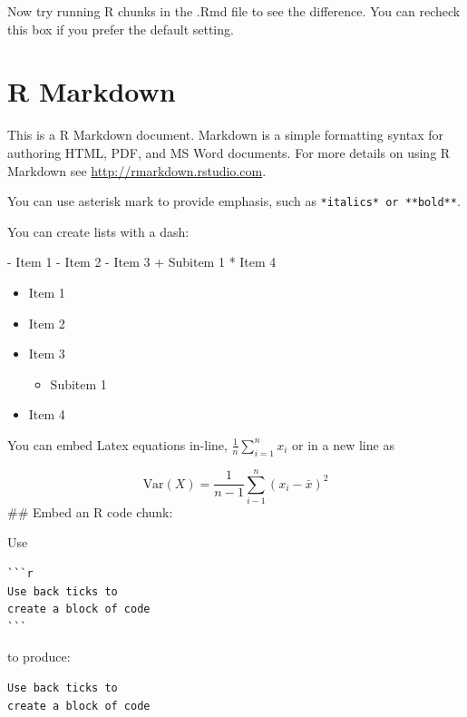 \documentclass[
]{book}
\newenvironment{Shaded}{\begin{snugshade}}{\end{snugshade}}
\newcommand{\DecValTok}[1]{\textcolor[rgb]{0.00,0.00,0.81}{#1}}
\newcommand{\NormalTok}[1]{#1}
\newcommand{\SpecialCharTok}[1]{\textcolor[rgb]{0.00,0.00,0.00}{#1}}
\providecommand{\tightlist}{%
  \setlength{\itemsep}{0pt}\setlength{\parskip}{0pt}}
\begin{document}
Now try running R chunks in the .Rmd file to see the difference. You can recheck this box if you prefer
the default setting.

\hypertarget{r-markdown}{%
\chapter{R Markdown}\label{r-markdown}}

This is a R Markdown document. Markdown is a simple formatting syntax for authoring HTML, PDF, and MS Word documents. For more details on using R Markdown see \url{http://rmarkdown.rstudio.com}.

You can use asterisk mark to provide emphasis, such as \texttt{*italics*\ or\ **bold**}.

You can create lists with a dash:

\begin{Shaded}
\begin{Highlighting}[]
\SpecialCharTok{{-}}\NormalTok{ Item }\DecValTok{1}
\SpecialCharTok{{-}}\NormalTok{ Item }\DecValTok{2}
\SpecialCharTok{{-}}\NormalTok{ Item }\DecValTok{3}
  \SpecialCharTok{+}\NormalTok{ Subitem }\DecValTok{1}
\SpecialCharTok{*}\NormalTok{ Item }\DecValTok{4}
\end{Highlighting}
\end{Shaded}

\begin{itemize}
\tightlist
\item
  Item 1
\item
  Item 2
\item
  Item 3

  \begin{itemize}
  \tightlist
  \item
    Subitem 1
  \end{itemize}
\item
  Item 4
\end{itemize}

You can embed Latex equations in-line, \(\frac{1}{n} \sum_{i=1}^{n} x_{i}\) or in a new line as

\[\text{Var}(X) = \frac{1}{n-1}\sum_{i-1}^{n} (x_{i} - \bar{x})^2 \]
\#\# Embed an R code chunk:

Use

\begin{verbatim}
```r
Use back ticks to 
create a block of code
```
\end{verbatim}

to produce:

\begin{verbatim}
Use back ticks to 
create a block of code
\end{verbatim}
\end{document}
